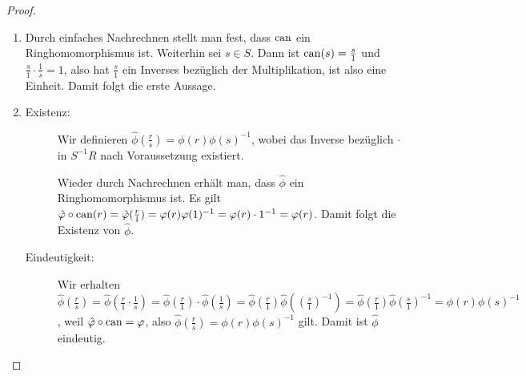 \documentclass[12pt,a4paper]{scrartcl}
\begin{document}
\begin{proof}
	\leavevmode
	\begin{enumerate}
		\item Durch einfaches Nachrechnen stellt man fest, dass $\operatorname{can}$ ein Ringhomomorphismus ist. Weiterhin sei $s\in S$. Dann ist $\operatorname{can}(s) = \frac s1$ und $\frac s1\cdot \frac1s = 1$, also hat $\frac s1$ ein Inverses bezüglich der Multiplikation, ist also eine Einheit. Damit folgt die erste Aussage.
		\item \begin{description}
			\item[Existenz:] Wir definieren $\hat{\phi}(\frac rs) = \phi(r)\phi(s)^{-1}$, wobei das Inverse bezüglich $\cdot$ in $S^{-1}R$ nach Voraussetzung existiert.
			
			Wieder durch Nachrechnen erhält man, dass $\hat{\phi}$ ein Ringhomomorphismus ist. Es gilt $\hat{\varphi}\circ \operatorname{can}(r) = \hat{\varphi}(\frac r1) = \varphi(r)\varphi(1)^{-1} = \varphi(r)\cdot 1^{-1} = \varphi(r) $. Damit folgt die Existenz von $\hat{\phi}$.
			\item[Eindeutigkeit:] Wir erhalten $\hat{\phi}(\frac rs) = \hat{\phi} (\frac r1\cdot \frac1s) = \hat{\phi}(\frac r1)\cdot \hat{\phi}(\frac1s) = \hat{\phi}(\frac r1)\hat{\phi}((\frac s1)^{-1}) = \hat{\phi}(\frac r1)\hat{\phi}(\frac s1)^{-1} = \phi(r)\phi(s)^{-1}$, weil $\hat{\varphi}\circ\operatorname{can} = \varphi$, also $\hat{\phi}(\frac rs) = \phi(r)\phi(s)^{-1}$ gilt. Damit ist $\hat{\phi}$ eindeutig.
		\end{description}
	\end{enumerate}
\end{proof}
\end{document}
